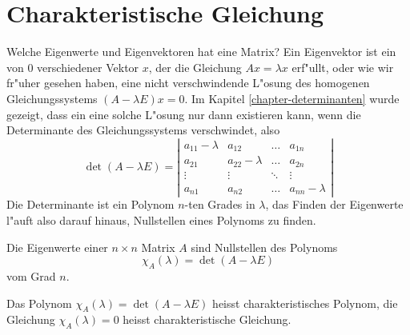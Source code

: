 \section{Charakteristische Gleichung}
Welche Eigenwerte und Eigenvektoren hat eine Matrix? Ein Eigenvektor 
ist ein von $0$ verschiedener Vektor $x$, der die Gleichung
$Ax=\lambda x$ erf"ullt, oder wie wir fr"uher gesehen haben,
eine nicht verschwindende L"osung des homogenen Gleichungssystems
$(A-\lambda E)x=0$.
Im Kapitel \ref{chapter-determinanten} wurde gezeigt, dass ein eine solche
L"osung nur dann existieren kann, wenn die Determinante des Gleichungssystems
verschwindet, also
\[
\det(A-\lambda E)=
\left|
\begin{matrix}
a_{11}-\lambda&a_{12}&\dots&a_{1n}\\
a_{21}&a_{22}-\lambda&\dots&a_{2n}\\
\vdots&\vdots&\ddots&\vdots\\
a_{n1}&a_{n2}&\dots&a_{nn}-\lambda
\end{matrix}
\right|
\]
Die Determinante ist ein Polynom $n$-ten Grades in $\lambda$, das Finden der
Eigenwerte l"auft also darauf hinaus, Nullstellen eines Polynoms zu finden.
\begin{satz}
Die Eigenwerte einer $n\times n$ Matrix $A$ sind Nullstellen des
Polynoms
\[
\chi_A(\lambda)=\det(A-\lambda E)
\]
vom Grad $n$.
\end{satz}
\begin{definition}
Das Polynom $\chi_A(\lambda)=\det(A-\lambda E)$ heisst
charakteristisches Polynom,
die Gleichung $\chi_A(\lambda)=0$ heisst 
charakteristische Gleichung.
\end{definition}

